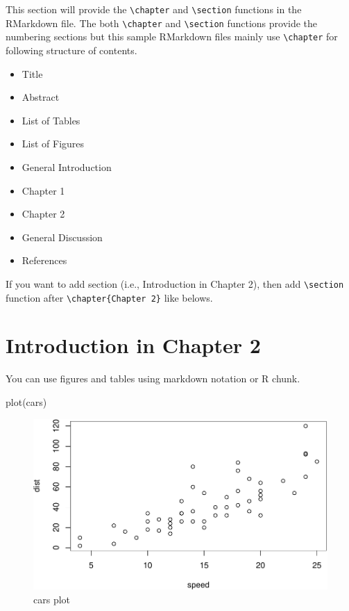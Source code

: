 \documentclass[12pt, a4paper]{report} %
\providecommand{\tightlist}{%
  \setlength{\itemsep}{0pt}\setlength{\parskip}{0pt}}
\newenvironment{Shaded}{\begin{snugshade}}{\end{snugshade}}
\newcommand{\FunctionTok}[1]{\textcolor[rgb]{0.00,0.00,0.00}{#1}}
\newcommand{\NormalTok}[1]{#1}
\begin{document}
This section will provide the \texttt{\textbackslash{}chapter} and
\texttt{\textbackslash{}section} functions in the RMarkdown file. The
both \texttt{\textbackslash{}chapter} and
\texttt{\textbackslash{}section} functions provide the numbering
sections but this sample RMarkdown files mainly use
\texttt{\textbackslash{}chapter} for following structure of contents.

\begin{itemize}
\tightlist
\item
  Title
\item
  Abstract
\item
  List of Tables
\item
  List of Figures
\item
  General Introduction
\item
  Chapter 1
\item
  Chapter 2
\item
  General Discussion
\item
  References
\end{itemize}

If you want to add section (i.e., Introduction in Chapter 2), then add
\texttt{\textbackslash{}section} function after
\texttt{\textbackslash{}chapter\{Chapter\ 2\}} like belows.

\section{Introduction in Chapter 2}

You can use figures and tables using markdown notation or R chunk.

\begin{Shaded}
\begin{Highlighting}[]
\FunctionTok{plot}\NormalTok{(cars)}
\end{Highlighting}
\end{Shaded}

\begin{figure}
\centering
\includegraphics{skeleton_files/figure-latex/cars-1.pdf}
\caption{cars plot}
\end{figure}
\end{document}
